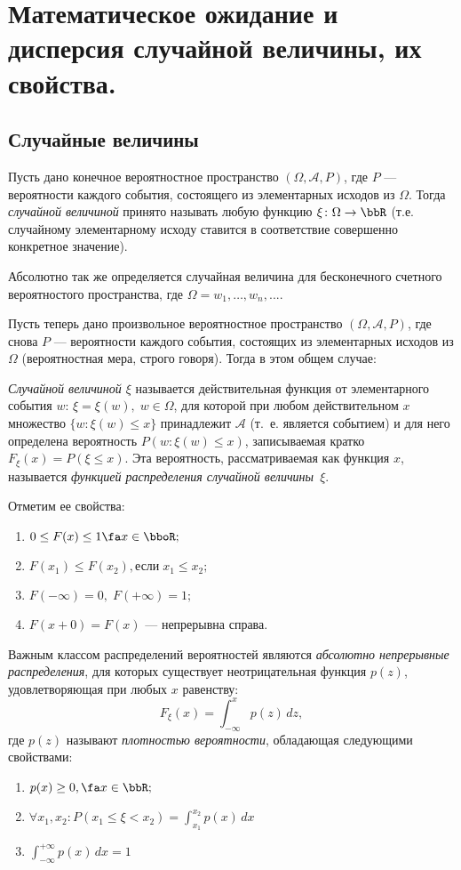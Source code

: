 \chapter{Математическое ожидание и дисперсия случайной величины, их свойства.}
\section{Случайные величины}

Пусть дано конечное вероятностное пространство $(\Omega,\mathcal A, P)$, где $P$ --- вероятности каждого события, состоящего из элементарных исходов из $\Omega$. Тогда \textit{случайной величиной} принято называть любую функцию $\xi\colon \Omega \to \bbR$ (т.е. случайному элементарному исходу ставится в соответствие совершенно конкретное значение).

Абсолютно так же определяется случайная величина для бесконечного счетного вероятностого пространства, где $\Omega = {w_1,\dots, w_n,...}$.

Пусть теперь дано произвольное вероятностное пространство $(\Omega,\mathcal A, P)$, где снова $P$ --- вероятности каждого события, состоящих из элементарных исходов из $\Omega$ (вероятностная мера, строго говоря). Тогда в этом общем случае:
\begin{defn}
\textit{Случайной величиной $\xi$} называется действительная функция от элементарного события $w$: $\xi = \xi(w), \; w\in\Omega$, для которой при любом действительном $x$ множество $\{w: \xi(w) \le x\}$ принадлежит $\mathcal A$ (т.~е. является событием) и для него определена вероятность $P(w: \xi(w) \le x)$, записываемая кратко $F_\xi(x)=P(\xi \le x)$. Эта вероятность, рассматриваемая как функция $x$, называется \textit{функцией распределения случайной величины~$\xi$}.
\end{defn}
Отметим ее свойства:
\begin{enumerate}
\item 
$0 \le F(x) \le 1 \fa x \in \bboR;$ 
\item
$F(x_1) \le F(x_2), \text{если}\; x_1\le x_2;$
\item
$F(-\infty)=0, \; F(+\infty)=1;$
\item
$F(x+0)=F(x)$ --- непрерывна справа.
\end{enumerate}

Важным классом распределений вероятностей являются \textit{абсолютно непрерывные распределения}, для которых существует неотрицательная функция $p(z)$, удовлетворяющая при любых $x$ равенству:
$$F_\xi(x)=\int_{-\infty}^{x}p(z)\,dz,$$ где $p(z)$ называют \textit{плотностью вероятности}, обладающая следующими свойствами:
\begin{enumerate}
\item 
$p(x)\ge 0, \fa x \in \bbR;$ 
\item 
$\forall x_1,x_2: P(x_1\le\xi<x_2)=\int_{x_1}^{x_2}p(x)\,dx$
\item
$\int_{-\infty}^{+\infty}p(x)\,dx=1$
\end{enumerate}

